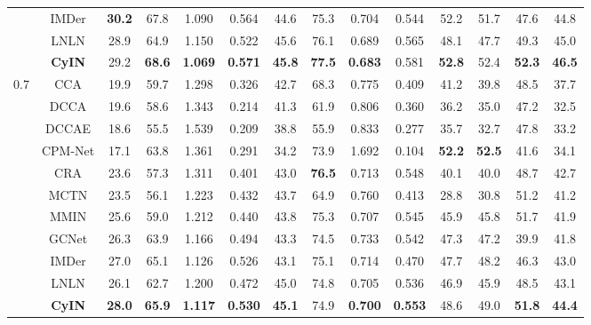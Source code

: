 \documentclass{article}
\begin{document}
\begin{table}[htbp]
{\begin{tabular}{cccccccccccccc}
        ~ & IMDer & \textbf{30.2}  & 67.8  & 1.090  & 0.564  & 44.6  & 75.3  & 0.704  & 0.544  & 52.2  & 51.7  & 47.6  & 44.8 \\ 
        ~ & LNLN & 28.9  & 64.9  & 1.150  & 0.522  & 45.6  & 76.1  & 0.689  & 0.565  & 48.1  & 47.7  & 49.3  & 45.0  \\ 
    & \textbf{CyIN} & 29.2 & \textbf{68.6} & \textbf{1.069} & \textbf{0.571} & \textbf{45.8} & \textbf{77.5} & \textbf{0.683} & 0.581 & \textbf{52.8} & 52.4 & \textbf{52.3} & \textbf{46.5} \\ 
    \midrule[0.5pt]
    \multirow{11}{*}{$0.7$} ~ & CCA & 19.9  & 59.7  & 1.298  & 0.326  & 42.7  & 68.3  & 0.775  & 0.409  & 41.2  & 39.8  & 48.5  & 37.7  \\ 
        ~ & DCCA & 19.6  & 58.6  & 1.343  & 0.214  & 41.3  & 61.9  & 0.806  & 0.360  & 36.2  & 35.0  & 47.2  & 32.5  \\ 
        ~ & DCCAE & 18.6  & 55.5  & 1.539  & 0.209  & 38.8  & 55.9  & 0.833  & 0.277  & 35.7  & 32.7  & 47.8  & 33.2  \\ 
        ~ & CPM-Net & 17.1  & 63.8  & 1.361  & 0.291  & 34.2  & 73.9  & 1.692  & 0.104  & \textbf{52.2}  & \textbf{52.5}  & 41.6  & 34.1  \\ 
        ~ & CRA & 23.6  & 57.3  & 1.311  & 0.401  & 43.0  & \textbf{76.5}  & 0.713  & 0.548  & 40.1  & 40.0  & 48.7  & 42.7  \\ 
        ~ & MCTN & 23.5  & 56.1  & 1.223  & 0.432  & 43.7  & 64.9  & 0.760  & 0.413  & 28.8  & 30.8  & 51.2  & 41.2  \\ 
        ~ & MMIN & 25.6  & 59.0  & 1.212  & 0.440  & 43.8  & 75.3  & 0.707  & 0.545  & 45.9  & 45.8  & 51.7  & 41.9 \\ 
        ~ & GCNet & 26.3  & 63.9  & 1.166  & 0.494  & 43.3  & 74.5  & 0.733  & 0.542  & 47.3  & 47.2  & 39.9  & 41.8  \\ 
        ~ & IMDer & 27.0  & 65.1  & 1.126  & 0.526  & 43.1  & 75.1  & 0.714  & 0.470  & 47.7  & 48.2  & 46.3  & 43.0 \\ 
        ~ & LNLN & 26.1  & 62.7  & 1.200  & 0.472  & 45.0  & 74.8  & 0.705  & 0.536  & 46.9  & 45.9  & 48.5  & 43.1  \\ 
    & \textbf{CyIN} &  \textbf{28.0} & \textbf{65.9} & \textbf{1.117} & \textbf{0.530} & \textbf{45.1} & 74.9 & \textbf{0.700} & \textbf{0.553} & 48.6 & 49.0 & \textbf{51.8} & \textbf{44.4} \\ 


\end{tabular}}
\end{table}
\end{document}
